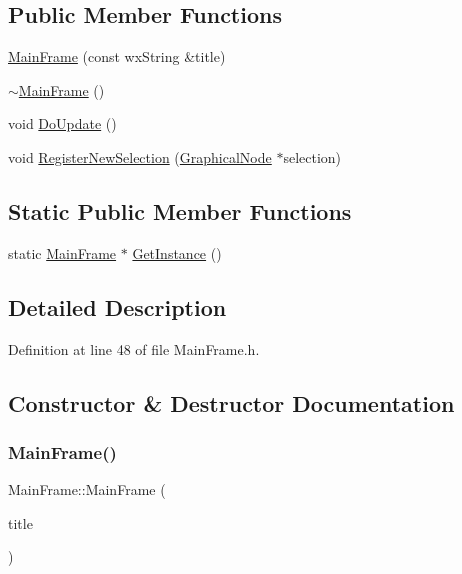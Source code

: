 \subsection*{Public Member Functions}
\begin{DoxyCompactItemize}
\item 
\hyperlink{class_main_frame_a00c85521dad6b24000967206bcc53688}{Main\+Frame} (const wx\+String \&title)
\item 
\hyperlink{class_main_frame_a0cfd88ece4836e0ea5430bd55370bf11}{$\sim$\+Main\+Frame} ()
\item 
void \hyperlink{class_main_frame_a3d8d476c8bb68d83d5dc006abb442851}{Do\+Update} ()
\item 
void \hyperlink{class_main_frame_af5c0679e1a94303e8bd0a0742c25a59b}{Register\+New\+Selection} (\hyperlink{class_graphical_node}{Graphical\+Node} $\ast$selection)
\end{DoxyCompactItemize}
\subsection*{Static Public Member Functions}
\begin{DoxyCompactItemize}
\item 
static \hyperlink{class_main_frame}{Main\+Frame} $\ast$ \hyperlink{class_main_frame_a17926c75eb083f5b8249696c4cdccf55}{Get\+Instance} ()
\end{DoxyCompactItemize}


\subsection{Detailed Description}


Definition at line 48 of file Main\+Frame.\+h.



\subsection{Constructor \& Destructor Documentation}
\mbox{\label{class_main_frame_a00c85521dad6b24000967206bcc53688}} 
\subsubsection{\texorpdfstring{Main\+Frame()}{MainFrame()}}
{\footnotesize\ttfamily Main\+Frame\+::\+Main\+Frame (\begin{DoxyParamCaption}\item[{const wx\+String \&}]{title }\end{DoxyParamCaption})}




